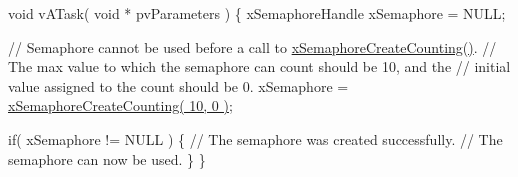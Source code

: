 \begin{DoxyPre}void vATask( void * pvParameters )
\{
xSemaphoreHandle xSemaphore = NULL;\end{DoxyPre}



\begin{DoxyPre}   // Semaphore cannot be used before a call to \hyperlink{semphr_8h_a7764616a918a46115403569a88148ad4}{xSemaphoreCreateCounting()}.
   // The max value to which the semaphore can count should be 10, and the
   // initial value assigned to the count should be 0.
   xSemaphore = \hyperlink{semphr_8h_a7764616a918a46115403569a88148ad4}{xSemaphoreCreateCounting( 10, 0 )};\end{DoxyPre}



\begin{DoxyPre}   if( xSemaphore != NULL )
   \{
       // The semaphore was created successfully.
       // The semaphore can now be used.  
   \}
\}
\end{DoxyPre}
 